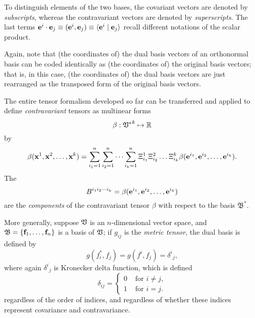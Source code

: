 To distinguish elements of the two bases, the covariant vectors are denoted by {\em subscripts},
whereas the contravariant vectors are denoted by {\em superscripts}.
The last terms $ {\bf e}^i\cdot{\bf e}_j\equiv ({\bf e}^i,{\bf e}_j)\equiv \langle {\bf e}^i\mid {\bf e}_j\rangle  $
recall different notations of the scalar product.

Again, note that (the coordinates of) the dual basis vectors of an orthonormal basis can be coded identically
as  (the coordinates of) the original basis vectors; that is,
in this case,
(the coordinates of) the dual basis vectors are just rearranged as the transposed form of the original basis vectors.


The entire tensor formalism developed so far can be transferred and applied to define {\em contravariant} tensors
as multinear forms
\begin{equation}
\beta:{ \frak V^\ast }^k \mapsto {\Bbb R}
\end{equation}
by
\begin{equation}
\beta ( {\bf x}^1,{\bf x}^2,\ldots ,{\bf x}^k)=
\sum_{i_1=1}^n
\sum_{i_2=1}^n
\cdots
\sum_{i_k=1}^n
\Xi_{i_1}^1 \Xi_{i_2}^2\ldots \Xi_{i_k}^k
\beta ( {\bf e}^{i_1},{\bf e}^{i_2},\ldots ,{\bf e}^{i_k}).
\end{equation}
The
\begin{equation}
B^{{i_1}{i_2}\cdots {i_k}}=\beta ( {\bf e}^{i_1},{\bf e}^{i_2},\ldots ,{\bf e}^{i_k})
\label{2011-m-tvtcontrav}
\end{equation}
 are the
{\em components} of the contravariant tensor $\beta $ with respect to the basis
${\mathfrak B}^\ast$.


More generally,
suppose ${\frak V}$ is an $n$-dimensional vector space, and
${\frak B} = \{{\bf f}_1,\ldots , {\bf f}_n\}$
is a basis of  ${\frak V}$;
if $g_{ij}$ is the {\em metric tensor},
the dual basis is defined by
\begin{equation}
g(f_i^*, f_j)=g( f^i,f_j)={\delta^i}_{j},
\end{equation}
where again  ${\delta^i}_{j}$    is Kronecker delta function, which is defined
\begin{equation}
\delta_{ij} =\begin{cases}
0  &\text{ for }i\neq j , \\
1  &\text{ for }i = j.
\end{cases}
\end{equation}
regardless of the order of indices, and regardless of whether these indices represent covariance and contravariance.

